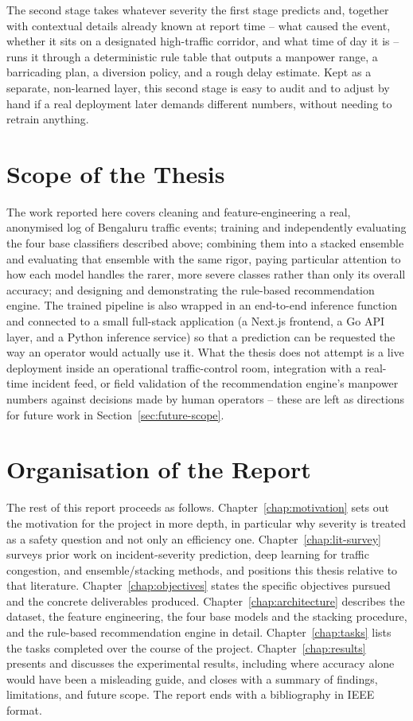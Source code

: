 The second stage takes whatever severity the first stage predicts and, together with contextual details already known at report time -- what caused the event, whether it sits on a designated high-traffic corridor, and what time of day it is -- runs it through a deterministic rule table that outputs a manpower range, a barricading plan, a diversion policy, and a rough delay estimate. Kept as a separate, non-learned layer, this second stage is easy to audit and to adjust by hand if a real deployment later demands different numbers, without needing to retrain anything.

\section{Scope of the Thesis}

The work reported here covers cleaning and feature-engineering a real, anonymised log of Bengaluru traffic events; training and independently evaluating the four base classifiers described above; combining them into a stacked ensemble and evaluating that ensemble with the same rigor, paying particular attention to how each model handles the rarer, more severe classes rather than only its overall accuracy; and designing and demonstrating the rule-based recommendation engine. The trained pipeline is also wrapped in an end-to-end inference function and connected to a small full-stack application (a Next.js frontend, a Go API layer, and a Python inference service) so that a prediction can be requested the way an operator would actually use it. What the thesis does not attempt is a live deployment inside an operational traffic-control room, integration with a real-time incident feed, or field validation of the recommendation engine's manpower numbers against decisions made by human operators -- these are left as directions for future work in Section~\ref{sec:future-scope}.

\section{Organisation of the Report}

The rest of this report proceeds as follows. Chapter~\ref{chap:motivation} sets out the motivation for the project in more depth, in particular why severity is treated as a safety question and not only an efficiency one. Chapter~\ref{chap:lit-survey} surveys prior work on incident-severity prediction, deep learning for traffic congestion, and ensemble/stacking methods, and positions this thesis relative to that literature. Chapter~\ref{chap:objectives} states the specific objectives pursued and the concrete deliverables produced. Chapter~\ref{chap:architecture} describes the dataset, the feature engineering, the four base models and the stacking procedure, and the rule-based recommendation engine in detail. Chapter~\ref{chap:tasks} lists the tasks completed over the course of the project. Chapter~\ref{chap:results} presents and discusses the experimental results, including where accuracy alone would have been a misleading guide, and closes with a summary of findings, limitations, and future scope. The report ends with a bibliography in IEEE format.
